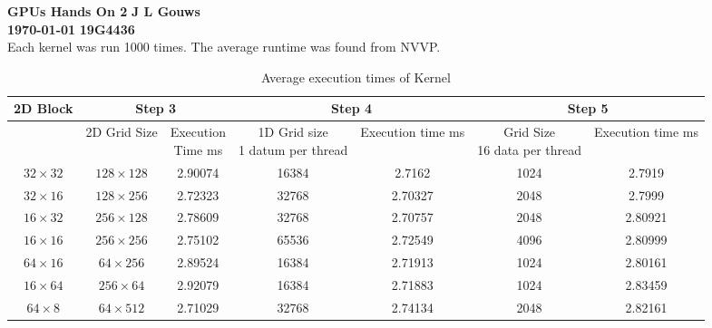 \documentclass[a4paper,12pt]{article}
\newcommand\block[1]{\hspace*{#1}}
\begin{document}
\selectfont
\thispagestyle{empty}

{\Large \textbf{GPUs Hands On 2}} \hfill {\Large \textbf{J L Gouws}}\\
\block{1.0cm} {\large \textbf{\today}} \hfill {\large \textbf{19G4436}}\\

Each kernel was run 1000 times. The average runtime was found from NVVP.
\begin{table}[htbp]
  \centering
  \begin{tabular}{|c|c|c|c|c|c|c|}
    \hline
    \textbf{2D Block} & \multicolumn{2}{c|}{\textbf{Step 3}} & \multicolumn{2}{c|}{\textbf{Step 4}} & \multicolumn{2}{c|}{\textbf{Step 5}}  \\ \hline
             & 2D Grid Size& \multicolumn{1}{p{5em}|}{Execution \newline Time ms} & \multicolumn{1}{p{5.5em}|}{1D Grid size\newline 1 datum per thread} & \multicolumn{1}{p{5.5em}|}{Execution time ms}&\multicolumn{1}{p{5em}|}{Grid Size\newline 16 data per thread} & \multicolumn{1}{p{5em}|}{Execution time ms} \\ \hline
    $32 \times 32$ & $128 \times 128$ & 2.90074 & 16384 & 2.7162 & 1024 & 2.7919 \\ \hline
    $32 \times 16$ & $128 \times 256$ & 2.72323 & 32768 & 2.70327 & 2048 & 2.7999 \\ \hline
    $16 \times 32$ & $256 \times 128$ & 2.78609 & 32768 & 2.70757 & 2048 & 2.80921 \\ \hline
    $16 \times 16$ & $256 \times 256$ & 2.75102 & 65536 & 2.72549 & 4096 & 2.80999 \\ \hline
    $64 \times 16$ & $64  \times 256$ & 2.89524 & 16384 & 2.71913 & 1024 & 2.80161 \\ \hline
    $16 \times 64$ & $256 \times 64 $ & 2.92079 & 16384 & 2.71883 & 1024 & 2.83459 \\ \hline
    $64 \times  8$ & $64  \times 512$ & 2.71029 & 32768 & 2.74134 & 2048 & 2.82161 \\ \hline
  \end{tabular}
  \caption{Average execution times of Kernel}
  \label{table2}
\end{table}
\end{document}
